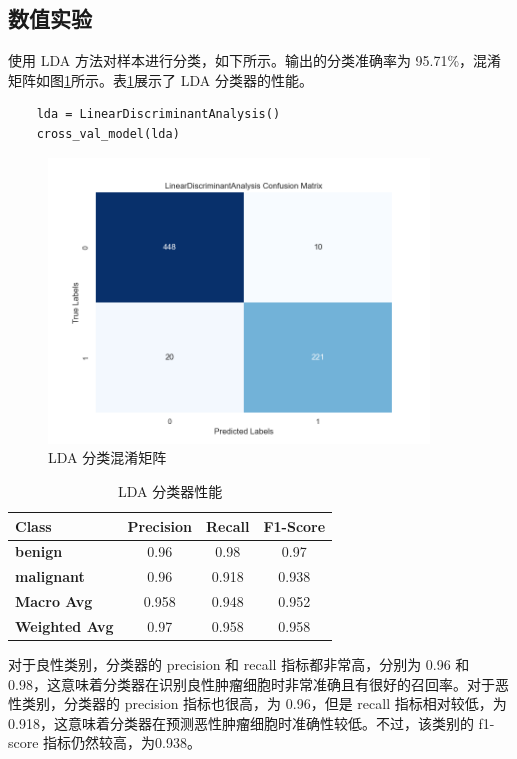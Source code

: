 \documentclass[a4paper,12pt,onecolumn,oneside]{article}
\begin{document}
\subsection{数值实验}
使用 LDA 方法对样本进行分类，如下所示。输出的分类准确率为 95.71\%，混淆矩阵如图\ref{fig:lda}所示。表\ref{tbl:lda}展示了 LDA 分类器的性能。\par 
\lstset{language=Python}
\lstset{frame=lines}
\lstset{basicstyle=\footnotesize}
\begin{lstlisting}
	lda = LinearDiscriminantAnalysis()
	cross_val_model(lda)
\end{lstlisting}
\begin{figure}[H]
	\centering
	\includegraphics[width=0.9\textwidth]{res3/lda.png}
	\caption{LDA 分类混淆矩阵}
	\label{fig:lda}
\end{figure}
\begin{table}[H]
	\centering
	\begin{tabular}{lccc}
		\toprule
		\textbf{Class} & \textbf{Precision} & \textbf{Recall} & \textbf{F1-Score} \\
		\midrule
		\textbf{benign} & 0.96 & 0.98 & 0.97 \\
		\textbf{malignant} & 0.96 & 0.918 & 0.938 \\
		\midrule
		\textbf{Macro Avg} & 0.958 & 0.948 & 0.952 \\
		\textbf{Weighted Avg} & 0.97 & 0.958 & 0.958 \\
		\bottomrule
	\end{tabular}
	\caption{LDA 分类器性能}
	\label{tbl:lda}
\end{table}
对于良性类别，分类器的 precision 和 recall 指标都非常高，分别为 0.96 和 0.98，这意味着分类器在识别良性肿瘤细胞时非常准确且有很好的召回率。对于恶性类别，分类器的 precision 指标也很高，为 0.96，但是 recall 指标相对较低，为 0.918，这意味着分类器在预测恶性肿瘤细胞时准确性较低。不过，该类别的 f1-score 指标仍然较高，为0.938。
\end{document}
